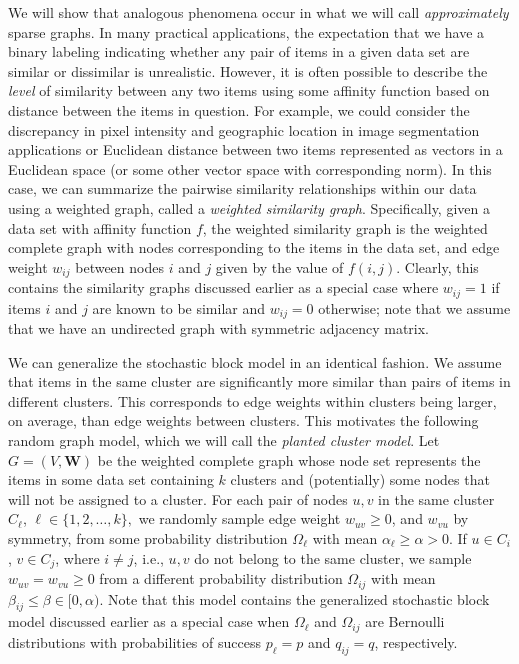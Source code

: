 \documentclass[twoside,11pt]{article}
\newcommand{\bs}{\boldsymbol}
\newcommand{\W}{\bs {W}}
\newcommand{\0}{\bs{0}}
\begin{document}
We will show that analogous phenomena occur in what we will call
\emph{approximately} sparse graphs.
In many practical applications, the expectation that we have a binary labeling
indicating whether any pair of items in a given data set are similar
or dissimilar is unrealistic. However, it is often possible to
describe the \emph{level} of similarity between any two items using some affinity
function based on distance between the items in question.
For example, we could consider the discrepancy in pixel intensity and geographic
location in image segmentation applications or Euclidean distance between
two items represented as vectors in a Euclidean space (or some other vector
space with corresponding norm).
In this case, we can summarize the pairwise similarity relationships within our
data using
a weighted graph, called a \emph{weighted similarity graph}.
Specifically, given a data set with affinity function \(f\),
the weighted similarity graph is the weighted complete graph with nodes
corresponding to the items in the data set, and edge weight \(w_{ij}\)
between nodes \(i\) and \(j\) given by the value of \(f(i,j)\).
Clearly, this contains the similarity graphs discussed earlier as a
special case where \(w_{ij} = 1\) if items \(i\) and \(j\) are known
to be similar and \(w_{ij} = 0\) otherwise; note that we assume that we have an undirected graph with
symmetric adjacency matrix.

We can generalize %
the stochastic block model in an identical fashion.
We assume that items in the same cluster are significantly
more similar than pairs of items in different clusters.
This corresponds to edge weights within clusters being larger, on average,
than edge weights between clusters.
This motivates the following random graph model,
which we will call the \emph{planted cluster model}.
Let \(G = (V,\W)\) be the weighted complete graph whose node set
represents the items in some data set containing \(k\) clusters and (potentially)
some nodes that will not be assigned to a cluster.
For each pair of nodes \(u,v \) in the same cluster $C_\ell$,
$\ell \in \{1,2,\dots, k\},$
we randomly sample
edge weight \(w_{uv} \ge 0\), and \(w_{vu}\) by symmetry,
from some probability distribution \(\Omega_\ell\)
with mean \(\alpha_\ell \ge \alpha > 0\). If \(u \in C_i\),
\(v \in C_j\), where $i \neq j$, i.e., $u,v$ do not belong to the same
cluster, we sample \(w_{uv} = w_{vu} \ge 0\) from a different probability distribution
\(\Omega_{ij}\) with mean \( \beta_{ij} \le \beta \in [0,\alpha) \).
Note that this model contains the generalized stochastic block model discussed
earlier as a special case when \(\Omega_\ell \) and \(\Omega_{ij}\)
are Bernoulli distributions with probabilities of success
\(p_\ell = p\) and \(q_{ij} = q\), respectively.
\end{document}
